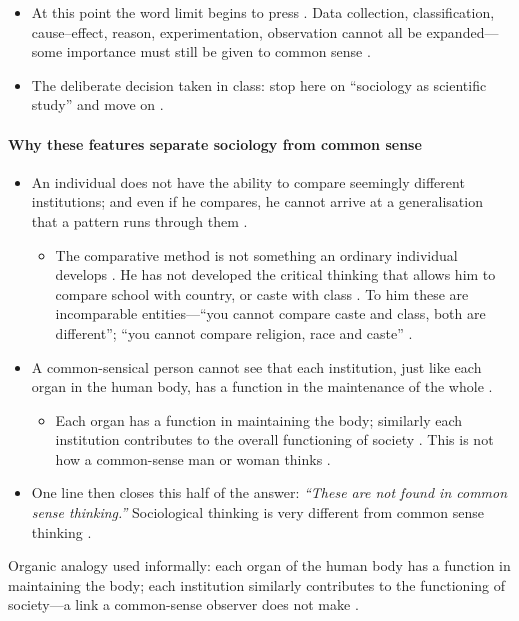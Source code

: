 \begin{CriticalPoint}
\begin{itemize}
    \item At this point the word limit begins to press . Data collection, classification, cause--effect, reason, experimentation, observation cannot all be expanded---some importance must still be given to common sense .
    \item The deliberate decision taken in class: stop here on ``sociology as scientific study'' and move on .
\end{itemize}
\end{CriticalPoint}

\paragraph{Why these features separate sociology from common sense}
\begin{itemize}
    \item An individual does not have the ability to compare seemingly different institutions; and even if he compares, he cannot arrive at a generalisation that a pattern runs through them .
    \begin{itemize}
        \item The comparative method is not something an ordinary individual develops . He has not developed the critical thinking that allows him to compare school with country, or caste with class . To him these are incomparable entities---``you cannot compare caste and class, both are different''; ``you cannot compare religion, race and caste'' .
    \end{itemize}
    \item A common-sensical person cannot see that each institution, just like each organ in the human body, has a function in the maintenance of the whole .
    \begin{itemize}
        \item Each organ has a function in maintaining the body; similarly each institution contributes to the overall functioning of society . This is not how a common-sense man or woman thinks .
    \end{itemize}
    \item One line then closes this half of the answer: \textit{``These are not found in common sense thinking.''}  Sociological thinking is very different from common sense thinking .
\end{itemize}

\begin{ExampleBox}
Organic analogy used informally: each organ of the human body has a function in maintaining the body; each institution similarly contributes to the functioning of society---a link a common-sense observer does not make .
\end{ExampleBox}

